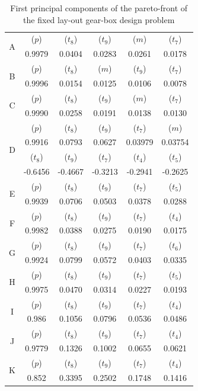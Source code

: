 \begin{table}[!ht]
  \centering
  \begin{tabular}{|c|c|c|c|c|c|}
    \hline
    \multirow{2}{*}{A}   & ($p$) &  ($t_8$) &  ($t_9$)  & ($m$) & ($t_7$)\\
    & 0.9979  & 0.0404  & 0.0283 & 0.0261 & 0.0178  \\
    \hline
    \multirow{2}{*}{B}   & ($p$) &  ($t_8$) &  ($m$)  & ($t_9$) & ($t_7$)\\
    & 0.9996 & 0.0154 & 0.0125 & 0.0106 &  0.0078 \\
    \hline
    \multirow{2}{*}{C} & ($p$) & ($t_8$) & ($t_9$) &  ($m$) & ($t_7$) \\
    & 0.9990 & 0.0258 & 0.0191 & 0.0138 & 0.0130 \\
    \hline
    \multirow{4}{*}{D} & ($p$) & ($t_8$) & ($t_9$) &  ($t_7$) & ($m$) \\
    & 0.9916 & 0.0793 & 0.0627 & 0.03979 & 0.03754 \\ 
    \cline{2-6}
    & ($t_8$) & ($t_9$) & ($t_7$) &  ($t_4$) & ($t_5$) \\
    & -0.6456 & -0.4667 & -0.3213 & -0.2941 & -0.2625 \\
    \hline
    \multirow{2}{*}{E} & ($p$) & ($t_8$) & ($t_9$) &  ($t_7$) & ($t_5$) \\
    & 0.9939 & 0.0706 & 0.0503 & 0.0378 & 0.0288 \\ 
    \hline
    \multirow{2}{*}{F} & ($p$) & ($t_8$) & ($t_9$) &  ($t_7$) & ($t_4$) \\
    & 0.9982 & 0.0388 & 0.0275 & 0.0190 & 0.0175 \\ 
    \hline
    \multirow{2}{*}{G} & ($p$) & ($t_8$) & ($t_9$) &  ($t_7$) & ($t_6$) \\
    & 0.9924 & 0.0799 & 0.0572 & 0.0403 & 0.0335 \\ 
    \hline
    \multirow{2}{*}{H} & ($p$) & ($t_8$) & ($t_9$) &  ($t_7$) & ($t_5$) \\
    & 0.9975 & 0.0470 & 0.0314 & 0.0227 & 0.0193 \\ 
    \hline
    \multirow{2}{*}{I} & ($p$) & ($t_8$) & ($t_9$) &  ($t_7$) & ($t_4$) \\
    & 0.986 & 0.1056 & 0.0796 & 0.0536 & 0.0486 \\ 
    \hline
    \multirow{2}{*}{J} & ($p$) & ($t_8$) & ($t_9$) &  ($t_7$) & ($t_4$) \\
    & 0.9779 & 0.1326 & 0.1002 & 0.0655 & 0.0621 \\ 
    \hline
    \multirow{2}{*}{K} & ($p$) & ($t_8$) & ($t_9$) &  ($t_7$) & ($t_4$) \\
    & 0.852 & 0.3395 & 0.2502 & 0.1748 & 0.1416 \\ 
    \hline
  \end{tabular}
  \caption{First principal components of the pareto-front of the fixed lay-out gear-box design problem}
  \label{first2GTPCs}
\end{table}



